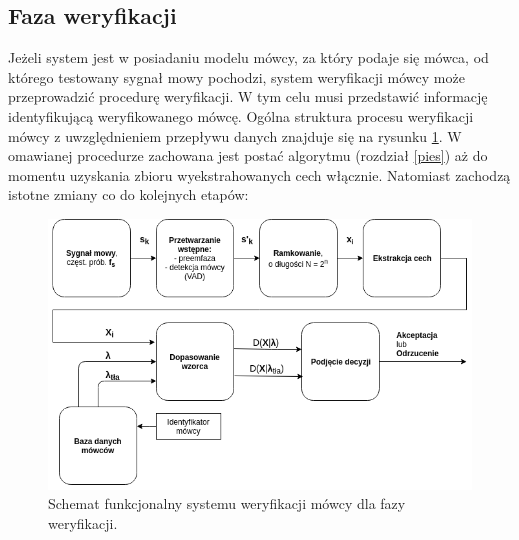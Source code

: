 \label{pies}

\subsection{Faza weryfikacji}

Jeżeli system jest w posiadaniu modelu mówcy, za który podaje się mówca, od którego testowany sygnał mowy pochodzi, system weryfikacji mówcy może przeprowadzić procedurę weryfikacji. W tym celu musi przedstawić informację identyfikującą weryfikowanego mówcę. Ogólna struktura procesu weryfikacji mówcy z uwzględnieniem przepływu danych znajduje się na rysunku {\ref{fig:fundiagverif}}. W omawianej procedurze zachowana jest postać algorytmu (rozdział \ref{pies}) aż do momentu uzyskania zbioru wyekstrahowanych cech włącznie. Natomiast zachodzą istotne zmiany co do kolejnych etapów:

\begin{figure}[ht!]
  \centering
    \includegraphics[width=1\textwidth]{./fundiagverif.png}
    \caption{\label{fig:fundiagverif} Schemat funkcjonalny systemu weryfikacji mówcy dla fazy weryfikacji.}
\end{figure}

